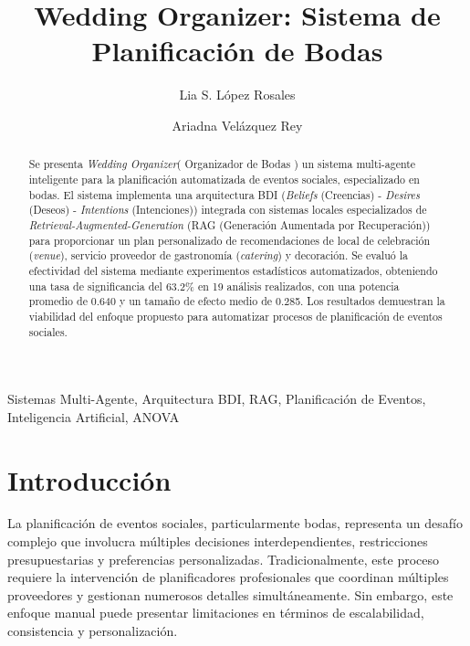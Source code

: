 \documentclass[runningheads,a4paper]{llncs}
\newcommand{\keywords}[1]{\par\addvspace\baselineskip
\noindent\keywordname\enspace\ignorespaces#1}
\begin{document}
\mainmatter

\title{Wedding Organizer: Sistema de Planificación de Bodas}


\author{Lia S. López Rosales\and Ariadna Velázquez Rey}


\maketitle

\begin{abstract}
Se presenta \textit{Wedding Organizer}( Organizador de Bodas ) un sistema multi-agente inteligente para la planificación 
automatizada de eventos sociales, especializado en bodas. El sistema implementa una arquitectura BDI 
(\textit{Beliefs} (Creencias) - \textit{Desires} (Deseos) - \textit{Intentions} (Intenciones))\cite{rao1995bdi} integrada 
con sistemas locales especializados de \textit{Retrieval-Augmented-Generation} (RAG (Generación Aumentada por Recuperación)) 
\cite{lewis2020retrieval} para proporcionar un plan personalizado de recomendaciones de local de celebración (\textit{venue}), 
servicio proveedor de gastronomía (\textit{catering}) y decoración. Se evaluó la efectividad del sistema mediante 
experimentos estadísticos automatizados, obteniendo una tasa de significancia del 63.2\% en 19 análisis realizados, con una 
potencia promedio de 0.640 y un tamaño de efecto medio de 0.285. Los resultados demuestran la viabilidad del enfoque 
propuesto para automatizar procesos de planificación de eventos sociales.
\end{abstract}

\keywords{Sistemas Multi-Agente, Arquitectura BDI, RAG, Planificación de Eventos, Inteligencia Artificial, ANOVA}

\section{Introducción}

La planificación de eventos sociales, particularmente bodas, representa un desafío complejo que involucra múltiples 
decisiones interdependientes, restricciones presupuestarias y preferencias personalizadas. Tradicionalmente, este proceso 
requiere la intervención de planificadores profesionales que coordinan múltiples proveedores y gestionan numerosos detalles 
simultáneamente. Sin embargo, este enfoque manual puede presentar limitaciones en términos de escalabilidad, consistencia 
y personalización.
\end{document}
